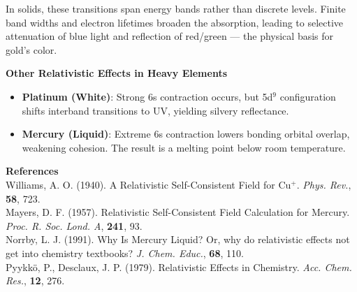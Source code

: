 \begin{technical}
    In solids, these transitions span energy bands rather than discrete levels. Finite band widths and electron lifetimes broaden the absorption, leading to selective attenuation of blue light and reflection of red/green — the physical basis for gold’s color.
    
    \noindent\textbf{Other Relativistic Effects in Heavy Elements}
    
    \begin{itemize}[leftmargin=*]
    \item \textbf{Platinum (White)}: Strong 6s contraction occurs, but 5d$^9$ configuration shifts interband transitions to UV, yielding silvery reflectance.
    
    \item \textbf{Mercury (Liquid)}: Extreme 6s contraction lowers bonding orbital overlap, weakening cohesion. The result is a melting point below room temperature.
    \end{itemize}
    

\vspace{0.5em}
\noindent\textbf{References}  \\
Williams, A. O. (1940). A Relativistic Self-Consistent Field for Cu\(^+\). \textit{Phys. Rev.}, \textbf{58}, 723.\\
Mayers, D. F. (1957). Relativistic Self-Consistent Field Calculation for Mercury. \textit{Proc. R. Soc. Lond. A}, \textbf{241}, 93.\\
Norrby, L. J. (1991). Why Is Mercury Liquid? Or, why do relativistic effects not get into chemistry textbooks? \textit{J. Chem. Educ.}, \textbf{68}, 110.\\
Pyykkö, P., Desclaux, J. P. (1979). Relativistic Effects in Chemistry. \textit{Acc. Chem. Res.}, \textbf{12}, 276.
\end{technical}
